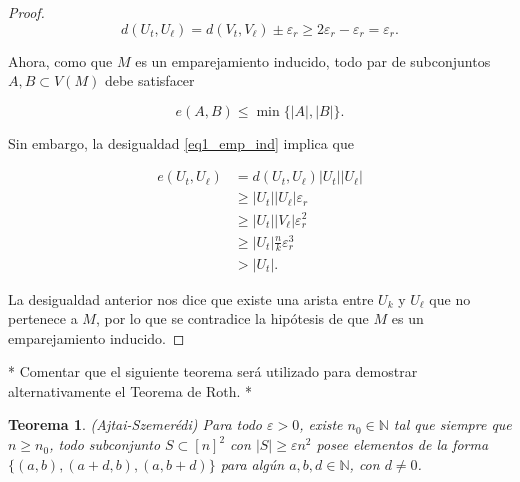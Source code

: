 \documentclass{article}[14pts]
\newcommand{\fs}[1]{{\color{blue}* #1 *}}
\newtheorem{teorema}{Teorema}
\let\varepsilon=\varepsilon
\begin{document}
\begin{proof}
    \begin{equation} \label{eq1_emp_ind}
        d(U_t, U_\ell) = d(V_t, V_\ell) \pm \varepsilon_r \geq 2\varepsilon_r - \varepsilon_r = \varepsilon_r.
    \end{equation}\medskip

    Ahora, como que $M$ es un emparejamiento inducido, todo par de subconjuntos $A,B\subset V(M)$ debe satisfacer\medskip

    \begin{equation*}
        e(A,B) \leq \min\lbrace |A|, |B|\rbrace.
    \end{equation*}\medskip

    Sin embargo, la desigualdad \eqref{eq1_emp_ind} implica que\medskip

    \begin{align*}
        e(U_t, U_\ell) &= d(U_t, U_\ell)|U_t||U_\ell|\\
        &\geq |U_t||U_\ell| \varepsilon_r\\
        &\geq |U_t| |V_\ell| \varepsilon_{r}^{2}\\
        &\geq |U_t|\frac{n}{k}\varepsilon_{r}^{3}\\
        &> |U_t|.
    \end{align*}\medskip

    La desigualdad anterior nos dice que existe una arista entre $U_k$ y $U_\ell$ que no pertenece a $M$, por lo que se contradice la hipótesis de que $M$ es un emparejamiento inducido. 
\end{proof}\medskip

\fs{Comentar que el siguiente teorema será utilizado para demostrar alternativamente el Teorema de Roth.}


\begin{teorema} \label{Corner_Theorem} (Ajtai-Szemerédi)
    Para todo $\varepsilon > 0$, existe $n_0\in\mathbb{N}$ tal que siempre que $n\geq n_0$, todo subconjunto $S\subset [n]^{2}$ con $|S| \geq \varepsilon n^{2}$ posee elementos de la forma $\lbrace (a,b), (a+d, b), (a, b+d)\rbrace$ para algún $a,b,d \in \mathbb{N}$, con $d \not= 0$.
\end{teorema}
\end{document}
